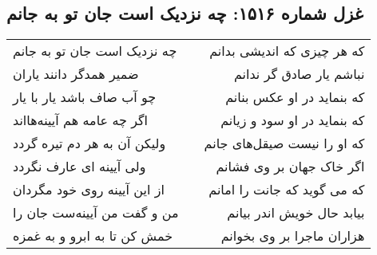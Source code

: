 \begin{center}
\section*{غزل شماره ۱۵۱۶: چه نزدیک است جان تو به جانم}
\label{sec:1516}
\begin{longtable}{l p{0.5cm} r}
چه نزدیک است جان تو به جانم
&&
که هر چیزی که اندیشی بدانم
\\
ضمیر همدگر دانند یاران
&&
نباشم یار صادق گر ندانم
\\
چو آب صاف باشد یار با یار
&&
که بنماید در او عکس بنانم
\\
اگر چه عامه هم آیینه‌هااند
&&
که بنماید در او سود و زیانم
\\
ولیکن آن به هر دم تیره گردد
&&
که او را نیست صیقل‌های جانم
\\
ولی آیینه ای عارف نگردد
&&
اگر خاک جهان بر وی فشانم
\\
از این آیینه روی خود مگردان
&&
که می گوید که جانت را امانم
\\
من و گفت من آیینه‌ست جان را
&&
بیابد حال خویش اندر بیانم
\\
خمش کن تا به ابرو و به غمزه
&&
هزاران ماجرا بر وی بخوانم
\\
\end{longtable}
\end{center}
